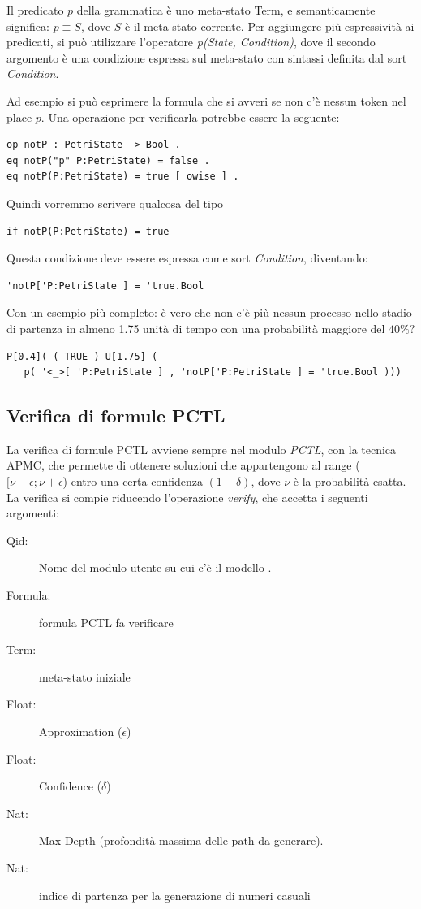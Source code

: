 Il predicato $p$ della grammatica è uno meta-stato Term, e semanticamente
significa: $p \equiv S$, dove $S$ è il meta-stato corrente. Per aggiungere più
espressività ai predicati, si può utilizzare l'operatore \emph{p(State, Condition)}, dove il
secondo argomento è una condizione espressa sul meta-stato con sintassi
definita dal sort \emph{Condition}.

Ad esempio si può esprimere la formula che si avveri se non c'è nessun token nel
place $p$. Una operazione per verificarla potrebbe essere la seguente:
\begin{Verbatim}[fontsize=\small]
op notP : PetriState -> Bool .
eq notP("p" P:PetriState) = false .
eq notP(P:PetriState) = true [ owise ] . 
\end{Verbatim}
Quindi vorremmo scrivere qualcosa del tipo
\begin{Verbatim}[fontsize=\small]
if notP(P:PetriState) = true
\end{Verbatim}
Questa condizione deve essere espressa come sort \emph{Condition}, diventando:
\begin{Verbatim}[fontsize=\small]
'notP['P:PetriState ] = 'true.Bool
\end{Verbatim}

Con un esempio più completo: è vero che non c'è più nessun processo nello stadio
di partenza in almeno 1.75 unità di tempo con una probabilità maggiore del
$40\%$? \begin{Verbatim}[fontsize=\small]
P[0.4]( ( TRUE ) U[1.75] (
   p( '<_>[ 'P:PetriState ] , 'notP['P:PetriState ] = 'true.Bool )))
\end{Verbatim}

\subsection{Verifica di formule PCTL}

La verifica di formule PCTL avviene sempre nel modulo \emph{PCTL}, con la
tecnica APMC, che permette di ottenere soluzioni che appartengono al range
($[\nu - \epsilon ; \nu + \epsilon$) entro una certa confidenza
$(1 - \delta)$, dove $\nu$ è la probabilità esatta. La verifica si compie
riducendo l'operazione \emph{verify}, che accetta i seguenti argomenti:
\begin{description}
\item[Qid:] Nome del modulo utente su cui c'è il modello .
\item[Formula:] formula PCTL fa verificare
\item[Term:] meta-stato iniziale
\item[Float:] Approximation ($\epsilon$)
\item[Float:] Confidence ($\delta$)
\item[Nat:] Max Depth (profondità massima delle path da generare).
\item[Nat:] indice di partenza per la generazione di numeri casuali
\end{description}

